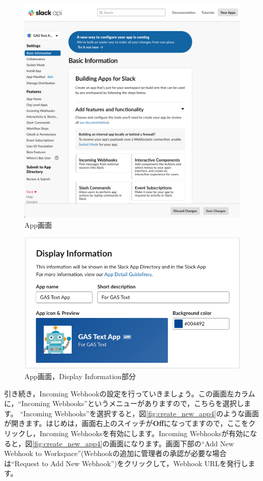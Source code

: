 \documentclass[uplatex,a4j]{jsarticle}
\begin{document}
\begin{figure}[H]
 \centering
 \includegraphics[keepaspectratio, scale=0.4]{images/create_new_app3.png}
 \caption{App画面}
 \label{fig:create_new_app3}
\end{figure}

\begin{figure}[H]
 \centering
 \includegraphics[keepaspectratio, scale=0.5]{images/create_new_app5.png}
 \caption{App画面，Display Information部分}
 \label{fig:create_new_app5}
\end{figure}

引き続き，Incoming Webhookの設定を行っていきましょう。この画面左カラムに，``Incoming Webhooks''というメニューがありますので，こちらを選択します。
``Incoming Webhooks''を選択すると，図\ref{fig:create_new_app4}のような画面が開きます。はじめは，画面右上のスイッチが\textbf{Off}になってますので，ここをクリックし，Incoming Webhooksを有効にします。Incoming Webhooksが有効になると，図\ref{fig:create_new_app4}の画面になります。画面下部の``Add New Webhook to Workspace''(Webhookの追加に管理者の承認が必要な場合は``Request to Add New Webhook'')をクリックして，Webhook URLを発行します。
\end{document}
